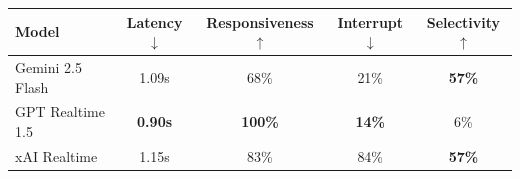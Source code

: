 \begin{tabular}{@{}lcccc@{}}
\toprule
\textbf{Model} & \textbf{Latency}$\downarrow$ & \textbf{Responsiveness}$\uparrow$ & \textbf{Interrupt}$\downarrow$ & \textbf{Selectivity}$\uparrow$ \\
\midrule
Gemini 2.5 Flash & 1.09s & 68\% & 21\% & \textbf{57\%} \\
GPT Realtime 1.5 & \textbf{0.90s} & \textbf{100\%} & \textbf{14\%} & 6\% \\
xAI Realtime & 1.15s & 83\% & 84\% & \textbf{57\%} \\
\bottomrule
\end{tabular}
